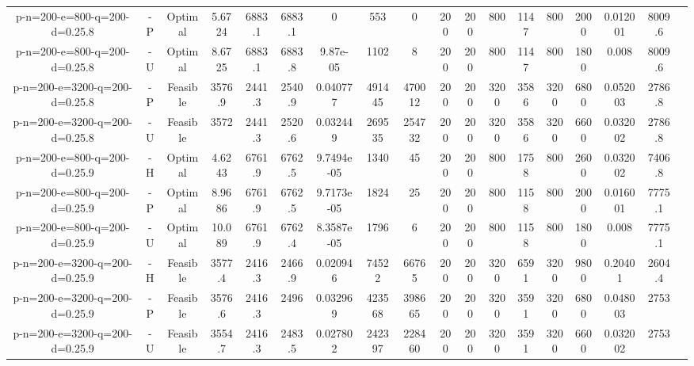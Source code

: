 \documentclass[landscape, a4paper]{article}
\begin{document}
\begin{center}
\begin{tabular}{@{}cccccccccccccccccc@{}}
p-n=200-e=800-q=200-d=0.25.8 & -P & Optimal & 5.6724 & 6883.1 & 6883.1 & 0 & 553 & 0 & 200 & 200 & 800 & 1147 & 800 & 2000 & 0.012001 & 8009.6 & \\
p-n=200-e=800-q=200-d=0.25.8 & -U & Optimal & 8.6725 & 6883.1 & 6883.8 & 9.87e-05 & 1102 & 8 & 200 & 200 & 800 & 1147 & 800 & 1800 & 0.008 & 8009.6 & \\
p-n=200-e=3200-q=200-d=0.25.8 & -P & Feasible & 3576.9 & 2441.3 & 2540.9 & 0.040777 & 491445 & 470012 & 200 & 200 & 3200 & 3586 & 3200 & 6800 & 0.052003 & 2786.8 & \\
p-n=200-e=3200-q=200-d=0.25.8 & -U & Feasible & 3572 & 2441.3 & 2520.6 & 0.032449 & 269535 & 254732 & 200 & 200 & 3200 & 3586 & 3200 & 6600 & 0.032002 & 2786.8 & \\
p-n=200-e=800-q=200-d=0.25.9 & -H & Optimal & 4.6243 & 6761.9 & 6762.5 & 9.7494e-05 & 1340 & 45 & 200 & 200 & 800 & 1758 & 800 & 2600 & 0.032002 & 7406.8 & \\
p-n=200-e=800-q=200-d=0.25.9 & -P & Optimal & 8.9686 & 6761.9 & 6762.5 & 9.7173e-05 & 1824 & 25 & 200 & 200 & 800 & 1158 & 800 & 2000 & 0.016001 & 7775.1 & \\
p-n=200-e=800-q=200-d=0.25.9 & -U & Optimal & 10.089 & 6761.9 & 6762.4 & 8.3587e-05 & 1796 & 6 & 200 & 200 & 800 & 1158 & 800 & 1800 & 0.008 & 7775.1 & \\
p-n=200-e=3200-q=200-d=0.25.9 & -H & Feasible & 3577.4 & 2416.3 & 2466.9 & 0.020946 & 74522 & 66765 & 200 & 200 & 3200 & 6591 & 3200 & 9800 & 0.20401 & 2604.4 & \\
p-n=200-e=3200-q=200-d=0.25.9 & -P & Feasible & 3576.6 & 2416.3 & 2496 & 0.032969 & 423568 & 398665 & 200 & 200 & 3200 & 3591 & 3200 & 6800 & 0.048003 & 2753 & \\
p-n=200-e=3200-q=200-d=0.25.9 & -U & Feasible & 3554.7 & 2416.3 & 2483.5 & 0.027802 & 242397 & 228460 & 200 & 200 & 3200 & 3591 & 3200 & 6600 & 0.032002 & 2753 & \\
\end{tabular}
\end{center}
\end{document}
